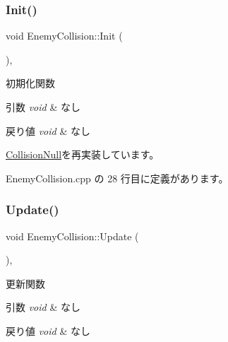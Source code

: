 \subsubsection{\texorpdfstring{Init()}{Init()}}
{\footnotesize\ttfamily void Enemy\+Collision\+::\+Init (\begin{DoxyParamCaption}{ }\end{DoxyParamCaption})\hspace{0.3cm}{\ttfamily [override]}, {\ttfamily [virtual]}}



初期化関数 


\begin{DoxyParams}{引数}
{\em void} & なし \\
\hline
\end{DoxyParams}

\begin{DoxyRetVals}{戻り値}
{\em void} & なし \\
\hline
\end{DoxyRetVals}


\mbox{\hyperlink{class_collision_null_a18cfc21fefcd3e8dec380ac44a85f111}{Collision\+Null}}を再実装しています。



 Enemy\+Collision.\+cpp の 28 行目に定義があります。

\mbox{\label{class_enemy_collision_ab54133504d867c6d2070d2f3854a0aaf}} 
\subsubsection{\texorpdfstring{Update()}{Update()}}
{\footnotesize\ttfamily void Enemy\+Collision\+::\+Update (\begin{DoxyParamCaption}{ }\end{DoxyParamCaption})\hspace{0.3cm}{\ttfamily [override]}, {\ttfamily [virtual]}}



更新関数 


\begin{DoxyParams}{引数}
{\em void} & なし \\
\hline
\end{DoxyParams}

\begin{DoxyRetVals}{戻り値}
{\em void} & なし \\
\hline
\end{DoxyRetVals}


